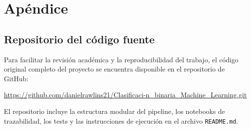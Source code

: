 \section{Apéndice}

\subsection{Repositorio del código fuente}

Para facilitar la revisión académica y la reproducibilidad del trabajo, el código original completo del proyecto se encuentra disponible en el repositorio de GitHub:

\url{https://github.com/danielrawlins21/Clasificaci-n_binaria_Machine_Learning.git}


El repositorio incluye la estructura modular del pipeline, los notebooks de trazabilidad, los tests y las instrucciones de ejecución en el archivo \texttt{README.md}.
